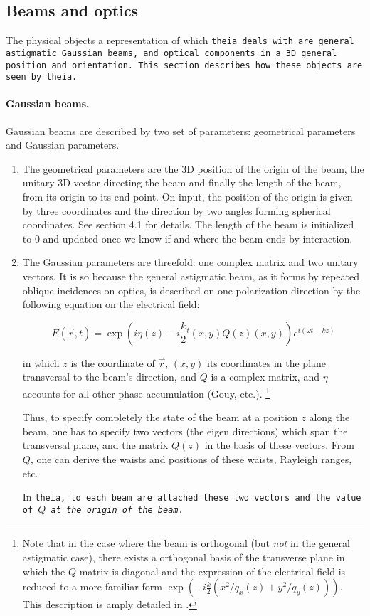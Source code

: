 \documentclass{article}
\begin{document}
\subsection{Beams and optics}
The physical objects a representation of which \tt{theia} deals with are general astigmatic Gaussian beams, and optical components in a 3D general position and orientation. This section describes how these objects are seen by \tt{theia}.



\paragraph{Gaussian beams.}Gaussian beams are described by two set of parameters: geometrical parameters and Gaussian parameters. 

\begin{enumerate}
\item The geometrical parameters are the 3D position of the origin of the beam, the unitary 3D vector directing the beam and finally the length of the beam, from its origin to its end point. On input, the position of the origin is given by three coordinates and the direction by two angles forming spherical coordinates. See section 4.1 for details. The length of the beam is initialized to 0 and updated once we know if and where the beam ends by interaction.

\item The Gaussian parameters are threefold: one complex matrix and two unitary vectors. It is so because the general astigmatic beam, as it forms by repeated oblique incidences on optics, is described on one polarization direction by the following equation on the electrical field:

$$ E(\vec r , t) = \exp(i\eta(z) -i\frac{k}{2} {}^t(x,y)Q(z)(x,y))e^{i(\omega t - kz)} $$

in which $z$ is the coordinate of $\vec r$, $(x,y)$ its coordinates in the plane transversal to the beam's direction, and $Q$ is a complex matrix, and $\eta$ accounts for all other phase accumulation (Gouy, etc.). \footnote{Note that in the case where the beam is orthogonal (but \textit{not} in the general astigmatic case), there exists a orthogonal basis of the transverse plane in which the $Q$ matrix is diagonal and the expression of the electrical field is reduced to a more familiar form $\exp(-i\frac{k}{2} (x^2/q_x(z) + y^2/q_y(z)))$. This description is amply detailed in \cite{1,2}.}

Thus, to specify completely the state of the beam at a position $z$ along the beam, one has to specify two vectors (the eigen directions) which span the transversal plane, and the matrix $Q(z)$ in the basis of these vectors. From $Q$, one can derive the waists and positions of these waists, Rayleigh ranges, etc.

In \tt{theia}, to each beam are attached these two vectors and the value of $Q$ \textit{at the origin of the beam}.
\end{enumerate}
\end{document}

